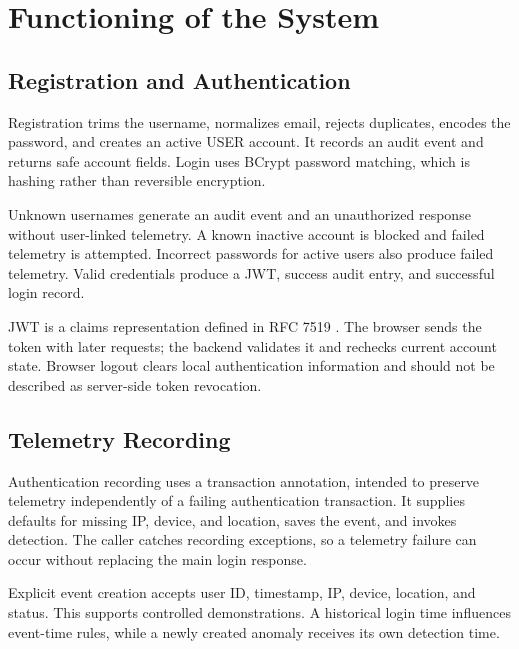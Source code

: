 \chapter{Functioning of the System}
\section{Registration and Authentication}
Registration trims the username, normalizes email, rejects duplicates, encodes the password, and creates an active USER account. It records an audit event and returns safe account fields. Login uses BCrypt password matching, which is hashing rather than reversible encryption.

Unknown usernames generate an audit event and an unauthorized response without user-linked telemetry. A known inactive account is blocked and failed telemetry is attempted. Incorrect passwords for active users also produce failed telemetry. Valid credentials produce a JWT, success audit entry, and successful login record.

JWT is a claims representation defined in RFC 7519 \cite{jwt}. The browser sends the token with later requests; the backend validates it and rechecks current account state. Browser logout clears local authentication information and should not be described as server-side token revocation.

\section{Telemetry Recording}
Authentication recording uses a  transaction annotation, intended to preserve telemetry independently of a failing authentication transaction. It supplies defaults for missing IP, device, and location, saves the event, and invokes detection. The caller catches recording exceptions, so a telemetry failure can occur without replacing the main login response.

Explicit event creation accepts user ID, timestamp, IP, device, location, and status. This supports controlled demonstrations. A historical login time influences event-time rules, while a newly created anomaly receives its own detection time.

